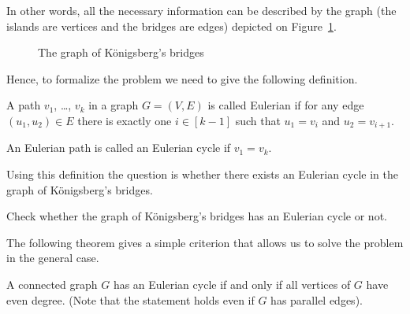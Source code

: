In other words, all the necessary information can be described by the graph
(the islands are vertices and the bridges are edges) depicted on
Figure~\ref{figure:konigsberg-graph}.
\begin{figure}
  \begin{center}
  \end{center}
  \caption{The graph of K\"{o}nigsberg's bridges}
  \label{figure:konigsberg-graph}
\end{figure}
Hence, to formalize the problem we need to give the following definition.
\begin{definition}
  A path $v_1$, \dots, $v_k$ in a graph $G = (V, E)$ is called Eulerian if for
  any edge $(u_1, u_2) \in E$ there is exactly one $i \in [k - 1]$ such that
  $u_1 = v_i$ and $u_2 = v_{i + 1}$.

  An Eulerian path is called an Eulerian cycle if $v_1 = v_k$.
\end{definition}
Using this definition the question is whether there exists an Eulerian cycle in
the graph of K\"{o}nigsberg's bridges.

\begin{exercise}
  Check whether the graph of K\"{o}nigsberg's bridges has an Eulerian cycle or
  not.
\end{exercise}

The following theorem gives a simple criterion that allows us to solve the
problem in the general case.
\begin{theorem}
\label{theorem:eulerian}
  A connected graph $G$ has an Eulerian cycle if and only if all vertices
  of $G$ have even degree.
  (Note that the statement holds even if $G$ has parallel edges).
\end{theorem}

